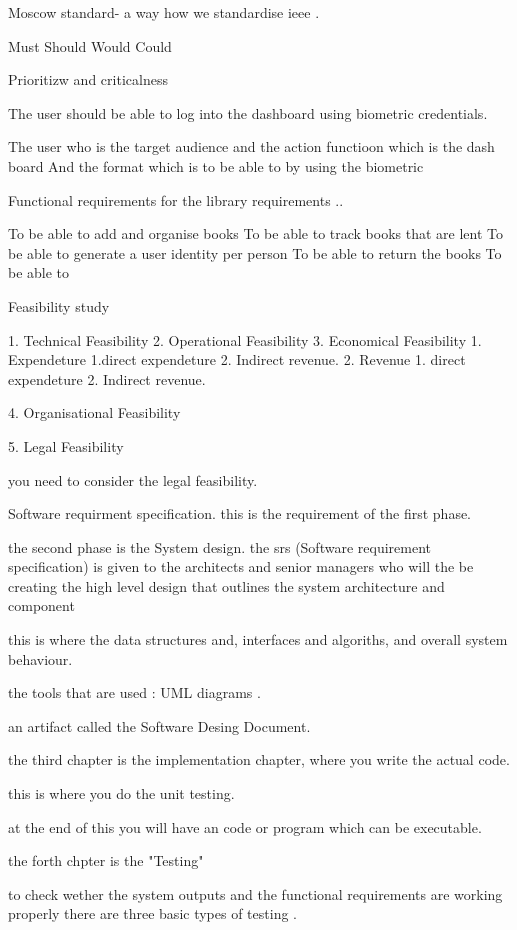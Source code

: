 \documentclass[a4paper]{article}
\begin{document}
Moscow standard- a way how we standardise  ieee .

Must  
Should   
Would  
Could 

Prioritizw and criticalness

The user should be able to log into the dashboard using biometric credentials. 

The user who is the target audience and the action functioon which is the dash board   
And the format which is to be able to by using the  biometric

Functional requirements for the library requirements ..

To be able to add and organise books  
To be able to track books that are lent   
To be able to generate a user identity per person  
To be able to return the books   
To be able to

Feasibility study

1. Technical Feasibility  
2. Operational Feasibility   
3. Economical Feasibility  
    1. Expendeture
        1.direct expendeture 
        2. Indirect revenue.
    2. Revenue
        1. direct expendeture
        2. Indirect revenue.


4. Organisational Feasibility  
     

5. Legal Feasibility
        
    you need to consider the legal feasibility.


Software requirment specification. this is the requirement of the first phase.

the second phase is the System design.
 the srs (Software requirement specification) is given to the architects and senior managers who will the be creating the high level design that 
outlines the system architecture and component 

this is where the data structures and, interfaces and algoriths, and overall system behaviour.
  
the tools that are used : UML diagrams .

an artifact called the Software Desing Document. 

the third chapter is the implementation chapter, where you write the actual code. 

this is where you do the unit testing.   

at the end of this you will have an code or program which can be executable.


the forth chpter is the "Testing"

to check wether the system outputs and the functional requirements are working properly
there are three basic types of testing .
\end{document}

